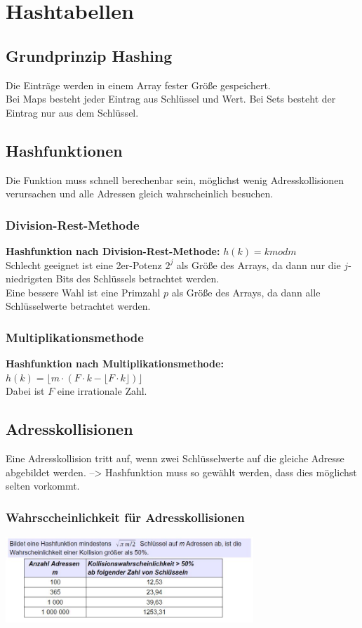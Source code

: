 \documentclass{scrreprt}
\begin{document}
\chapter{Hashtabellen}
\section{Grundprinzip Hashing}
Die Einträge werden in einem Array fester Größe gespeichert.
\\ Bei Maps besteht jeder Eintrag aus Schlüssel und Wert. Bei Sets besteht der Eintrag nur aus dem Schlüssel.
\section{Hashfunktionen}
Die Funktion muss schnell berechenbar sein, möglichst wenig Adresskollisionen verursachen und alle Adressen gleich wahrscheinlich besuchen.
\subsection{Division-Rest-Methode}
\textbf{Hashfunktion nach Division-Rest-Methode:} $h(k) = k mod m$
\\Schlecht geeignet ist eine 2er-Potenz $2^j$ als Größe des Arrays, da dann nur die $j$-niedrigsten Bits des Schlüssels betrachtet werden.
\\Eine bessere Wahl ist eine Primzahl $p$ als Größe des Arrays, da dann alle Schlüsselwerte betrachtet werden.
\subsection{Multiplikationsmethode}
\textbf{Hashfunktion nach Multiplikationsmethode:} $h(k) = \lfloor m \cdot (F \cdot k - \lfloor F \cdot k \rfloor ) \rfloor$
\\Dabei ist $F$ eine irrationale Zahl.
\section{Adresskollisionen}
Eine Adresskollision tritt auf, wenn zwei Schlüsselwerte auf die gleiche Adresse abgebildet werden. --> Hashfunktion muss so gewählt werden, dass dies möglichst selten vorkommt.
\subsection{Wahrsccheinlichkeit für Adresskollisionen}
\includegraphics[width=0.7\textwidth]{graphics/kollisionen}
\end{document}
